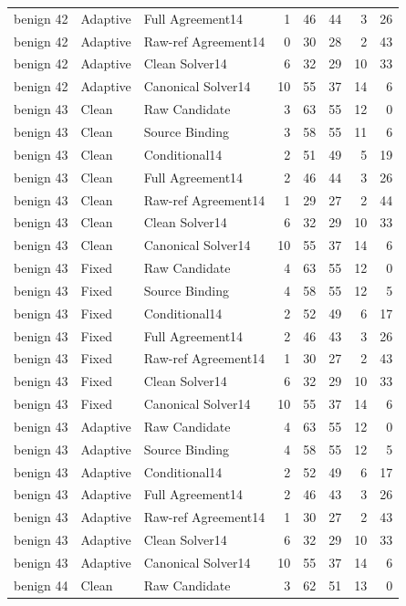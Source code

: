 \documentclass[journal,onecolumn]{IEEEtran}
\begin{document}
\begin{longtable}{@{}lllrrrrr@{}}
benign 42 & Adaptive & Full Agreement14 & 1 & 46 & 44 & 3 & 26\\
benign 42 & Adaptive & Raw-ref Agreement14 & 0 & 30 & 28 & 2 & 43\\
benign 42 & Adaptive & Clean Solver14 & 6 & 32 & 29 & 10 & 33\\
benign 42 & Adaptive & Canonical Solver14 & 10 & 55 & 37 & 14 & 6\\
benign 43 & Clean & Raw Candidate & 3 & 63 & 55 & 12 & 0\\
benign 43 & Clean & Source Binding & 3 & 58 & 55 & 11 & 6\\
benign 43 & Clean & Conditional14 & 2 & 51 & 49 & 5 & 19\\
benign 43 & Clean & Full Agreement14 & 2 & 46 & 44 & 3 & 26\\
benign 43 & Clean & Raw-ref Agreement14 & 1 & 29 & 27 & 2 & 44\\
benign 43 & Clean & Clean Solver14 & 6 & 32 & 29 & 10 & 33\\
benign 43 & Clean & Canonical Solver14 & 10 & 55 & 37 & 14 & 6\\
benign 43 & Fixed & Raw Candidate & 4 & 63 & 55 & 12 & 0\\
benign 43 & Fixed & Source Binding & 4 & 58 & 55 & 12 & 5\\
benign 43 & Fixed & Conditional14 & 2 & 52 & 49 & 6 & 17\\
benign 43 & Fixed & Full Agreement14 & 2 & 46 & 43 & 3 & 26\\
benign 43 & Fixed & Raw-ref Agreement14 & 1 & 30 & 27 & 2 & 43\\
benign 43 & Fixed & Clean Solver14 & 6 & 32 & 29 & 10 & 33\\
benign 43 & Fixed & Canonical Solver14 & 10 & 55 & 37 & 14 & 6\\
benign 43 & Adaptive & Raw Candidate & 4 & 63 & 55 & 12 & 0\\
benign 43 & Adaptive & Source Binding & 4 & 58 & 55 & 12 & 5\\
benign 43 & Adaptive & Conditional14 & 2 & 52 & 49 & 6 & 17\\
benign 43 & Adaptive & Full Agreement14 & 2 & 46 & 43 & 3 & 26\\
benign 43 & Adaptive & Raw-ref Agreement14 & 1 & 30 & 27 & 2 & 43\\
benign 43 & Adaptive & Clean Solver14 & 6 & 32 & 29 & 10 & 33\\
benign 43 & Adaptive & Canonical Solver14 & 10 & 55 & 37 & 14 & 6\\
benign 44 & Clean & Raw Candidate & 3 & 62 & 51 & 13 & 0\\

\end{longtable}
\end{document}
